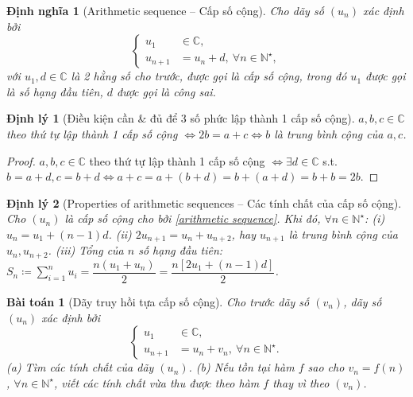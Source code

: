 \documentclass{article}
\newtheorem{baitoan}{Bài toán}
\newtheorem{dinhly}{Định lý}
\newtheorem{dinhnghia}{Định nghĩa}
\begin{document}
\begin{dinhnghia}[Arithmetic sequence -- Cấp số cộng]
	Cho dãy số $(u_n)$ xác định bởi
	\begin{equation}
		\label{arithmetic sequence}
		\tag{csc}
		\left\{\begin{split}
			u_1&\in\mathbb{C},\\
			u_{n+1} &= u_n + d,\ \forall n\in\mathbb{N}^\star,
		\end{split}\right.
	\end{equation}
	với $u_1,d\in\mathbb{C}$ là 2 hằng số cho trước, được gọi là {\rm cấp số cộng}, trong đó $u_1$ được gọi là {\rm số hạng đầu tiên}, $d$ được gọi là {\rm công sai}.
\end{dinhnghia}

\begin{dinhly}[Điều kiện cần \& đủ để 3 số phức lập thành 1 cấp số cộng]
	$a,b,c\in\mathbb{C}$ theo thứ tự lập thành 1 cấp số cộng $\Leftrightarrow2b = a + c\Leftrightarrow b$ là trung bình cộng của $a,c$.
\end{dinhly}

\begin{proof}
	$a,b,c\in\mathbb{C}$ theo thứ tự lập thành 1 cấp số cộng $\Leftrightarrow\exists d\in\mathbb{C}$ s.t. $b = a + d,c = b + d\Leftrightarrow a + c = a + (b + d) = b + (a + d) = b + b = 2b$.
\end{proof}

\begin{dinhly}[Properties of arithmetic sequences -- Các tính chất của cấp số cộng]
	\label{thm: properties of arithmetic sequences}
	Cho $(u_n)$ là cấp số cộng cho bởi \eqref{arithmetic sequence}. Khi đó, $\forall n\in\mathbb{N}^\star$: (i) $u_n = u_1 + (n - 1)d$. (ii) $2u_{n+1} = u_n + u_{n+2}$, hay $u_{n+1}$ là trung bình cộng của $u_n,u_{n+2}$. (iii) Tổng của $n$ số hạng đầu tiên: $S_n\coloneqq\sum_{i=1}^n u_i = \dfrac{n(u_1 + u_n)}{2} = \dfrac{n[2u_1 + (n - 1)d]}{2}$.
\end{dinhly}

\begin{baitoan}[Dãy truy hồi tựa cấp số cộng]
	Cho trước dãy số $(v_n)$, dãy số $(u_n)$ xác định bởi
	\begin{equation*}
		\left\{\begin{split}
			u_1&\in\mathbb{C},\\
			u_{n+1} &= u_n + v_n,\ \forall n\in\mathbb{N}^\star.
		\end{split}\right.
	\end{equation*}
	(a) Tìm các tính chất của dãy $(u_n)$. (b) Nếu tồn tại hàm $f$ sao cho $v_n = f(n)$, $\forall n\in\mathbb{N}^\star$, viết các tính chất vừa thu được theo hàm $f$ thay vì theo $(v_n)$.
\end{baitoan}
\end{document}
